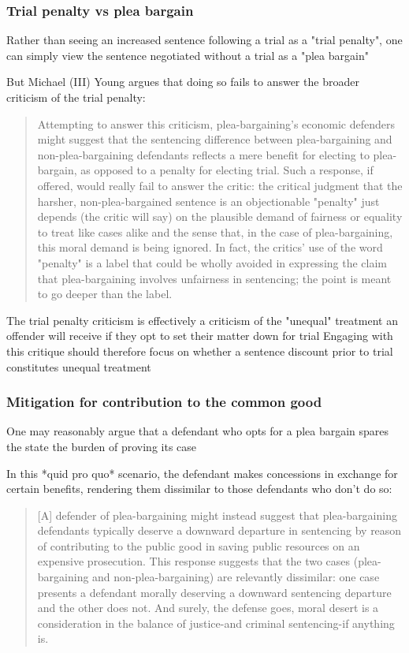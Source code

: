 \subsubsection{Trial penalty vs plea bargain}

Rather than seeing an increased sentence following a trial as a "trial penalty", one can simply view the sentence negotiated without a trial as a "plea bargain"

But Michael (III) Young argues that doing so fails to answer the broader criticism of the trial penalty:

\begin{quote}
    Attempting to answer this criticism, plea-bargaining's economic defenders might suggest that the sentencing difference between plea-bargaining and non-plea-bargaining defendants reflects a mere benefit for electing to plea-bargain, as opposed to a penalty for electing trial. Such a response, if offered, would really fail to answer the critic: the critical judgment that the harsher, non-plea-bargained sentence is an objectionable "penalty" just depends (the critic will say) on the plausible demand of fairness or equality to treat like cases alike and the sense that, in the case of plea-bargaining, this moral demand is being ignored. In fact, the critics' use of the word "penalty" is a label that could be wholly avoided in expressing the claim that plea-bargaining involves unfairness in sentencing; the point is meant to go deeper than the label.
\end{quote}

The trial penalty criticism is effectively a criticism of the "unequal" treatment an offender will receive if they opt to set their matter down for trial
Engaging with this critique should therefore focus on whether a sentence discount prior to trial constitutes unequal treatment

\subsubsection{Mitigation for contribution to the common good}

One may reasonably argue that a defendant who opts for a plea bargain spares the state the burden of proving its case

In this *quid pro quo* scenario, the defendant makes concessions in exchange for certain benefits, rendering them dissimilar to those defendants who don't do so:

\begin{quote}
    [A] defender of plea-bargaining might instead suggest that plea-bargaining defendants typically deserve a downward departure in sentencing by reason of contributing to the public good in saving public resources on an expensive prosecution. This response suggests that the two cases (plea-bargaining and non-plea-bargaining) are relevantly dissimilar: one case presents a defendant morally deserving a downward sentencing departure and the other does not. And surely, the defense goes, moral desert is a consideration in the balance of justice-and criminal sentencing-if anything is.
\end{quote}

